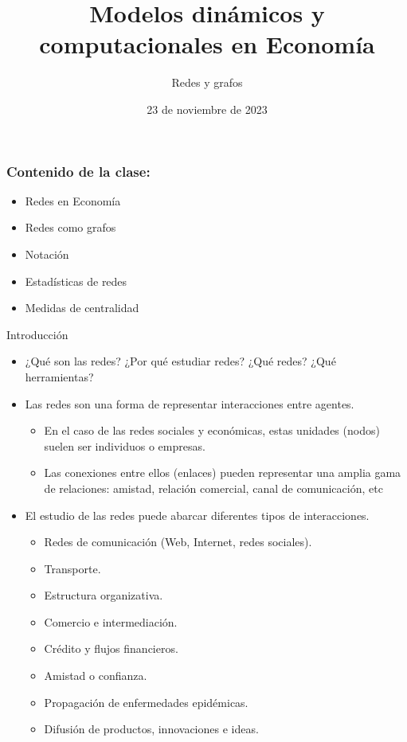 \documentclass[11pt]{beamer}
\begin{document}
	\title{Modelos dinámicos y computacionales en Economía}
	\subtitle{Redes y grafos}
	\date{23 de noviembre de 2023}

	\frame[plain]{
	\begin{figure}
	\centering
	\label{fig:netlogo-title-wide-60}
\end{figure}	
		\vspace{-1cm}
\maketitle
}

\begin{frame}
\frametitle{Contenido de la clase:}
\begin{itemize}
\item Redes en Economía
\item Redes como grafos
\item Notación
\item Estadísticas de redes
\item Medidas de centralidad
\end{itemize}
\end{frame}

\begin{frame}{Introducción}
    \begin{itemize}
        \item ¿Qué son las redes? ¿Por qué estudiar redes? ¿Qué redes?
¿Qué herramientas?
\item Las redes son una forma de representar interacciones entre agentes.
\begin{itemize}
    \item En el caso de las redes sociales y económicas, estas unidades (nodos) suelen ser individuos o empresas.
\item Las conexiones entre ellos (enlaces) pueden representar una amplia gama de relaciones: amistad, relación comercial, canal de comunicación, etc
\end{itemize}
\item El estudio de las redes puede abarcar diferentes tipos de interacciones.
\begin{itemize}
    \item Redes de comunicación (Web, Internet, redes sociales).
    \item Transporte.
\item  Estructura organizativa.
\item  Comercio e intermediación.
\item  Crédito y ﬂujos financieros.
\item Amistad o confianza.
\item Propagación de enfermedades epidémicas.
\item Difusión de productos, innovaciones e ideas.
\end{itemize}
    \end{itemize}
\end{frame}
\end{document}
